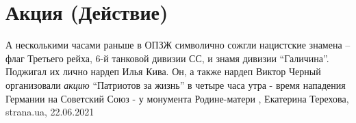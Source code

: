  
 
 
 
 
\chapter{Акция (Действие)}
\label{sec:slova.akcia.dejstvie}

А несколькими часами раньше в ОПЗЖ символично сожгли нацистские знамена – флаг
Третьего рейха, 6-й танковой дивизии СС, и знамя дивизии \enquote{Галичина}. Поджигал
их лично нардеп Илья Кива.  Он, а также нардеп Виктор Черный организовали \emph{акцию}
\enquote{Патриотов за жизнь} в четыре часа утра - время нападения Германии на Советский
Союз - у монумента Родине-матери
, Екатерина Терехова, strana.ua, 22.06.2021
